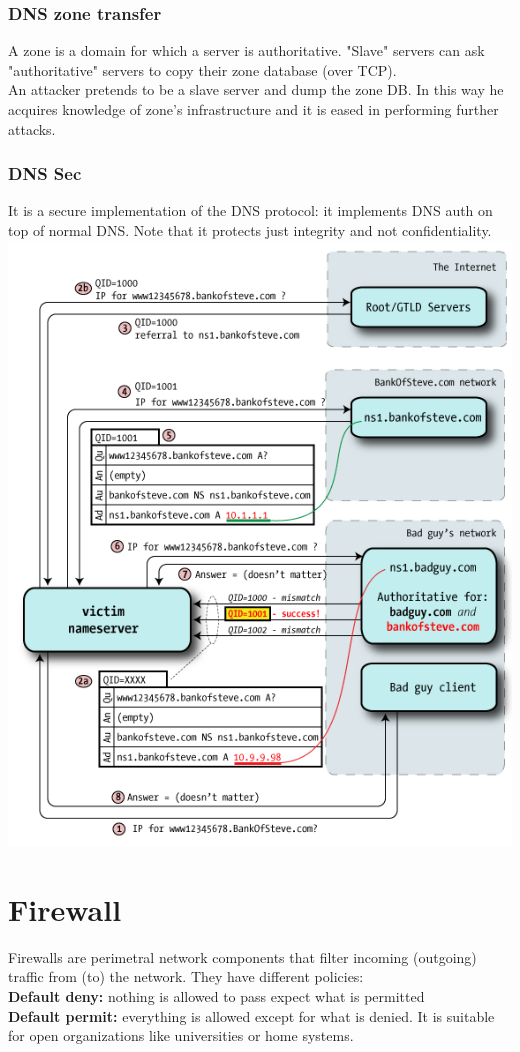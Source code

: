 \documentclass[10pt,a4paper]{book}
\begin{document}
\subsection{DNS zone transfer}
A zone is a domain for which a server is authoritative. "Slave" servers can ask "authoritative" servers to copy their zone database (over TCP).\\
An attacker pretends to be a slave server and dump the zone DB. In this way he acquires knowledge of zone's infrastructure and it is eased in performing further attacks.
\subsection{DNS Sec}
It is a secure implementation of the DNS protocol: it implements DNS auth on top of normal DNS. Note that it protects just integrity and not confidentiality.
\newpage
\includegraphics[scale=0.7]{img/kaminsky.png}
\chapter{Firewall}
Firewalls are perimetral network components that filter incoming (outgoing) traffic from (to) the network. They have different policies:\\
\textbf{Default deny:} nothing is allowed to pass expect what is permitted\\
\textbf{Default permit:} everything is allowed except for what is denied. It is suitable for open organizations like universities or home systems.
\end{document}
